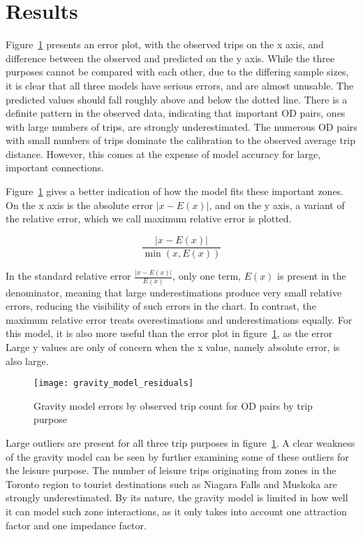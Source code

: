 \section{Results}
Figure~\ref{fig:gravity-residuals} presents an error plot, with the observed trips on the x axis, and difference between the observed and predicted on the y axis. While the three purposes cannot be compared with each other, due to the differing sample sizes, it is clear that all three models have serious errors, and are almost unusable. The predicted values should fall roughly above and below the dotted line. There is a definite pattern in the observed data, indicating that important OD pairs, ones with large numbers of trips, are strongly underestimated. The numerous OD pairs with small numbers of trips dominate the calibration to the observed average trip distance. However, this comes at the expense of model accuracy for large, important connections.

Figure~\ref{fig:gravity-residuals} gives a better indication of how the model fits these important zones. On the x axis is the absolute error $|x - E(x)|$, and on the y axis, a variant of the relative error, which we call maximum relative error is plotted. 

$$\frac{|x-E(x)|}{\min(x, E(x))}$$

In the standard relative error $\frac{|x-E(x)|}{E(x)}$, only one term, $E(x)$ is present in the denominator, meaning that large underestimations produce very small relative errors, reducing the visibility of such errors in the chart. In contrast, the maximum relative error treats overestimations and underestimations equally. For this model, it is also more useful than the error plot in figure~\ref{fig:gravity-residuals}, as the error Large y values are only of concern when the x value, namely absolute error, is also large.

\begin{figure}[H]
\centering
\texttt{[image: gravity\_model\_residuals]}
\caption{Gravity model errors by observed trip count for OD pairs by trip purpose}
\label{fig:gravity-residuals}
\end{figure}

Large outliers are present for all three trip purposes in figure~\ref{fig:gravity-residuals}. A clear weakness of the gravity model can be seen by further examining some of these outliers for the leisure purpose. The number of leisure trips originating from zones in the Toronto region to tourist destinations such as Niagara Falls and Muskoka are strongly underestimated. By its nature, the gravity model is limited in how well it can model such zone interactions, as it only takes into account one attraction factor and one impedance factor.

